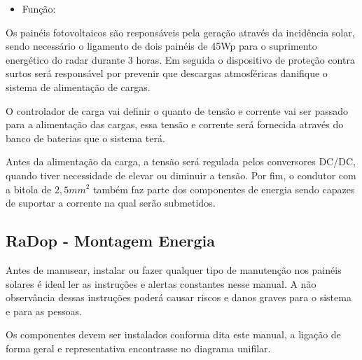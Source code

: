               \begin{itemize}
                 \item Função:
             \end{itemize}
             
Os painéis fotovoltaicos são responsáveis pela geração através da incidência solar, sendo necessário o ligamento de dois painéis de 45Wp para o suprimento energético do radar durante 3 horas. Em seguida o dispositivo de proteção contra surtos será responsável por prevenir que descargas atmosféricas danifique o sistema de alimentação de cargas.
             
O controlador de carga vai definir o quanto de tensão e corrente vai ser passado para a alimentação das cargas, essa tensão e corrente será fornecida através do banco de baterias que o sistema terá.
             
Antes da alimentação da carga, a tensão será regulada pelos conversores DC/DC, quando tiver necessidade de elevar ou diminuir a tensão. Por fim, o condutor com a bitola de $2,5 mm^2$  também faz parte dos componentes de energia sendo capazes de suportar a corrente na qual serão submetidos.
             
    \subsection{RaDop - Montagem Energia}
             
    Antes de manusear, instalar ou fazer qualquer tipo de manutenção nos painéis solares é ideal ler as instruções e alertas constantes nesse manual. A não observância dessas instruções poderá causar riscos e danos graves para o sistema e para as pessoas. 
             
    Os componentes devem ser instalados conforma dita este manual, a ligação de forma geral e representativa encontrasse no diagrama unifilar.
             
